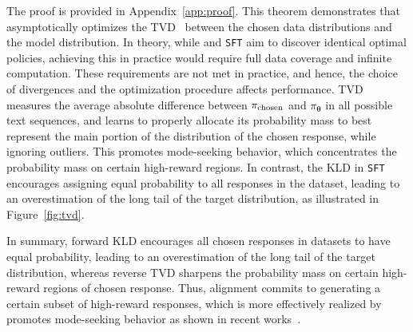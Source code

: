 The proof is provided in Appendix~\ref{app:proof}. This theorem demonstrates that \method asymptotically optimizes the TVD~\citep{van2014probability,jitailoring} between the chosen data distributions and the model distribution. In theory, while \method and \texttt{SFT} aim to discover identical optimal policies, achieving this in practice would require full data coverage and infinite computation. These requirements are not met in practice, and hence, the choice of divergences and the optimization procedure affects
performance.  TVD measures the average absolute difference between $\pi_{\rm{chosen}}$ and $\pi_{\boldsymbol{\theta}}$ in all possible text sequences, and \method learns to properly allocate its probability mass to best represent the main portion of the distribution of the chosen response, while ignoring outliers. This promotes mode-seeking  behavior, which concentrates the probability mass on certain high-reward regions.  In contrast, the KLD in \texttt{SFT} encourages assigning equal probability to all responses in the dataset, leading to an overestimation of the long tail of the target distribution, as illustrated in Figure~\ref{fig:tvd}. 


In summary, forward KLD encourages all chosen responses in datasets to have equal probability, leading to an overestimation of the long tail of the target distribution,  whereas reverse TVD sharpens the probability mass on certain high-reward regions of chosen response. Thus, alignment commits to generating a certain subset of high-reward responses, which is more effectively realized
by promotes mode-seeking behavior as shown in recent works~\citep{tajwar2024preference,xiao2024Cal}.








